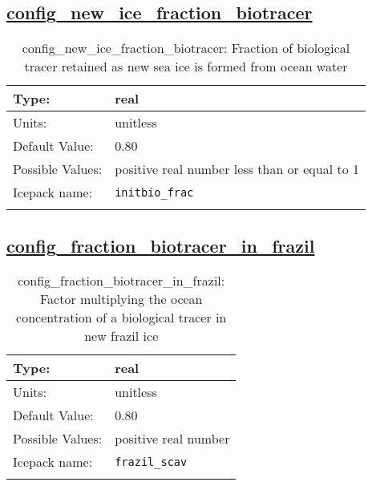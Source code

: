 \subsection[config\_new\_ice\_fraction\_biotracer]{\hyperref[sec:nm_tab_biogeochemistry]{config\_new\_ice\_fraction\_biotracer}}
\label{subsec:nm_sec_config_new_ice_fraction_biotracer}
\begin{center}
\begin{longtable}{| p{2.0in} || p{4.0in} |}
    \hline
    Type: & real \\
    \hline
    Units: & \si{unitless} \\
    \hline
    Default Value: & 0.80 \\
    \hline
    Possible Values: & positive real number less than or equal to 1 \\
    \hline
    \hline
    Icepack name: & \verb+initbio_frac+ \\
    \caption{config\_new\_ice\_fraction\_biotracer: Fraction of biological tracer retained as new sea ice is formed from ocean water}
\end{longtable}
\end{center}
\subsection[config\_fraction\_biotracer\_in\_frazil]{\hyperref[sec:nm_tab_biogeochemistry]{config\_fraction\_biotracer\_in\_frazil}}
\label{subsec:nm_sec_config_fraction_biotracer_in_frazil}
\begin{center}
\begin{longtable}{| p{2.0in} || p{4.0in} |}
    \hline
    Type: & real \\
    \hline
    Units: & \si{unitless} \\
    \hline
    Default Value: & 0.80 \\
    \hline
    Possible Values: & positive real number \\
    \hline
    \hline
    Icepack name: & \verb+frazil_scav+ \\
    \caption{config\_fraction\_biotracer\_in\_frazil: Factor multiplying the ocean concentration of a biological tracer in new frazil ice}
\end{longtable}
\end{center}
